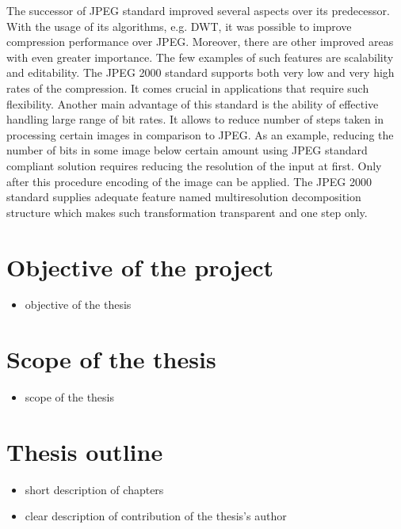The successor of JPEG standard improved several aspects over its predecessor. With the usage of its algorithms,
e.g. DWT, it was possible to improve compression performance over JPEG. Moreover, there are other improved areas
with even greater importance. The few examples of such features are scalability and editability. \cite{jpeg2000}
The JPEG 2000 standard supports both very low and very high rates of the compression. It comes crucial
in applications that require such flexibility. Another main advantage of this standard is the ability of
effective handling large range of bit rates. It allows to reduce number of steps taken in processing
certain images in comparison to JPEG. As an example, reducing the number of bits in some image below certain
amount using JPEG standard compliant solution requires reducing the resolution of the input at first.
Only after this procedure encoding of the image can be applied. The JPEG 2000 standard supplies adequate feature
named multiresolution decomposition structure which makes such transformation transparent and one step only. \cite{jpeg2000}


\section{Objective of the project}

\begin{itemize}
    \item objective of the thesis 
\end{itemize}


\section{Scope of the thesis}

\begin{itemize}
    \item scope of the thesis
\end{itemize}


\section{Thesis outline}

\begin{itemize}
    \item short description of chapters
    \item clear description of contribution of the thesis's author
\end{itemize}
